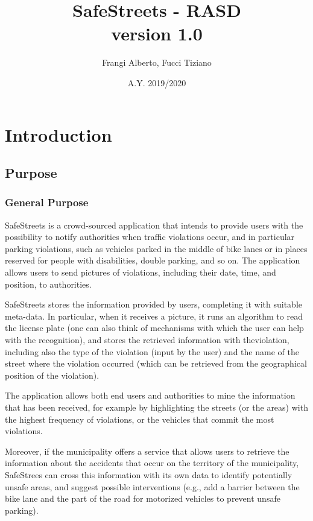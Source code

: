 \documentclass[12pt,a4paper]{report}
\title{SafeStreets - RASD \\ \large version 1.0}
\author{Frangi Alberto, Fucci Tiziano}
\date{A.Y. 2019/2020}
\begin{document}
\maketitle

\setcounter{tocdepth}{1}

\tableofcontents
\chapter{Introduction}
	\section{Purpose}
		\subsection{General Purpose}
SafeStreets is a crowd-sourced application that intends to provide users with the possibility to notify authorities when traffic violations occur, and in particular parking violations, such as vehicles parked in the middle of bike lanes or in places reserved for people with disabilities, double parking, and so on. The application allows users to send pictures of violations, including their date, time, and position, to authorities.
 
SafeStreets stores the information provided by users, completing it with suitable meta-data. In particular, when it receives a picture, it runs an algorithm to read the license plate (one can also think of mechanisms with which the user can help with the recognition), and stores the retrieved information with theviolation, including also the type of the violation (input by the user) and the name of the street where the violation occurred (which can be retrieved from the geographical position of the violation). 

The application allows both end users and authorities to mine the information that has been received, for example by highlighting the streets (or the areas) with the highest frequency of violations, or the vehicles that commit the most violations. 

Moreover, if the municipality offers a service that allows users to retrieve the information about the accidents that occur on the territory of the municipality, SafeStrees can cross this information with its own data to identify potentially unsafe areas, and suggest possible interventions (e.g., add a barrier between the bike lane and the part of the road for motorized vehicles to prevent unsafe parking).
\end{document}
